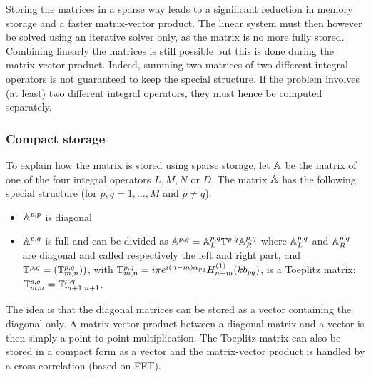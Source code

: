 Storing the matrices in a sparse way leads to a significant reduction in memory storage and a faster matrix-vector product. The linear system must then however be solved using an iterative solver only, as the matrix is no more fully stored. Combining linearly the matrices is still possible but this is done during the matrix-vector product. Indeed, summing two matrices of two different integral operators is not guaranteed to keep the special structure. If the problem involves (at least) two different integral operators, they must hence be computed separately.

\subsubsection{Compact storage}

To explain how the matrix is stored using \mudiff sparse storage, let ${\mathbb{A}}$ be the matrix of one of the four integral operators $L,M,N$ or $D$. The matrix ${\mathbb{A}}$ has the following special structure (for $p,q=1,\ldots,M$ and $p\neq q$):
\begin{itemize}
\item $\mathbb{A}^{p,p}$ is diagonal
\item $\mathbb{A}^{p,q}$ is full and can be divided as $\mathbb{A}^{p,q} = {\mathbb{A}}_L^{p,q}\mathbb{T}^{p,q}{\mathbb{A}}_R^{p,q}$ where ${\mathbb{A}}_L^{p,q}$ and ${\mathbb{A}}_R^{p,q}$ are diagonal and called respectively the left and right part, and $\mathbb{T}^{p,q} = (\mathbb{T}^{p,q}_{m,n}))$, with $\mathbb{T}^{p,q}_{m,n} = i\pi e^{i(n-m)\alpha_{pq}}H_{n-m}^{(1)}(kb_{pq})$, is a Toeplitz matrix: $\mathbb{T}^{p,q}_{m,n} = \mathbb{T}^{p,q}_{m+1,n+1}$.
\end{itemize}

The idea is that the diagonal matrices can be stored as a vector containing the diagonal only. A matrix-vector product between a diagonal matrix and a vector is then simply a point-to-point multiplication. The Toeplitz matrix can also be stored in a compact form as a vector and the matrix-vector product is handled by a cross-correlation (based on FFT). 

